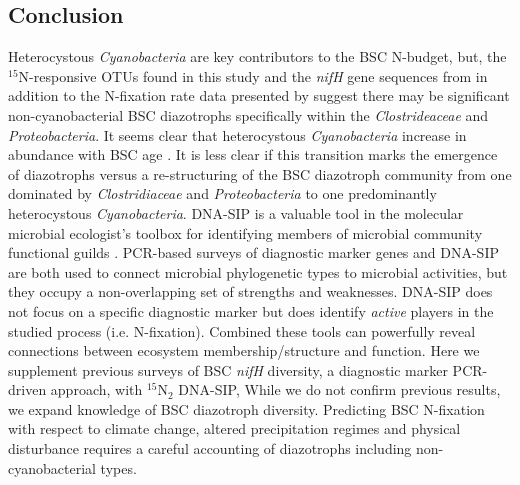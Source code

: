 \subsection{Conclusion}
Heterocystous \textit{Cyanobacteria} are key contributors to the BSC N-budget,
but, the $^{15}$N-responsive OTUs found in this study and the \textit{nifH}
gene sequences from \citet{Steppe_1996} in addition to the N-fixation rate data
presented by \citet{15643930} suggest there may be significant
non-cyanobacterial BSC diazotrophs specifically within the
\textit{Clostrideaceae} and \textit{Proteobacteria}. It seems clear that
heterocystous \textit{Cyanobacteria} increase in abundance with BSC age
\citep{14766579}. It is less clear if this transition marks the emergence of
diazotrophs versus a re-structuring of the BSC diazotroph community from one
dominated by \textit{Clostridiaceae} and \textit{Proteobacteria} to one
predominantly heterocystous \textit{Cyanobacteria}. DNA-SIP is a valuable tool
in the molecular microbial ecologist's toolbox for identifying members of
microbial community functional guilds \citep{17446886}. PCR-based surveys of
diagnostic marker genes and DNA-SIP are both used to connect microbial
phylogenetic types to microbial activities, but they occupy a non-overlapping
set of strengths and weaknesses. DNA-SIP does not focus on a specific diagnostic
marker but does identify \textit{active} players in the studied process (i.e. 
N-fixation). Combined these tools can powerfully reveal connections between
ecosystem membership/structure and function. Here we supplement previous
surveys of BSC \textit{nifH} diversity, a diagnostic marker PCR-driven
approach, with $^{15}$N$_{2}$ DNA-SIP, While we do not confirm previous
results, we expand knowledge of BSC diazotroph diversity.  Predicting BSC
N-fixation with respect to climate change, altered precipitation regimes and
physical disturbance requires a careful accounting of diazotrophs including
non-cyanobacterial types. 

